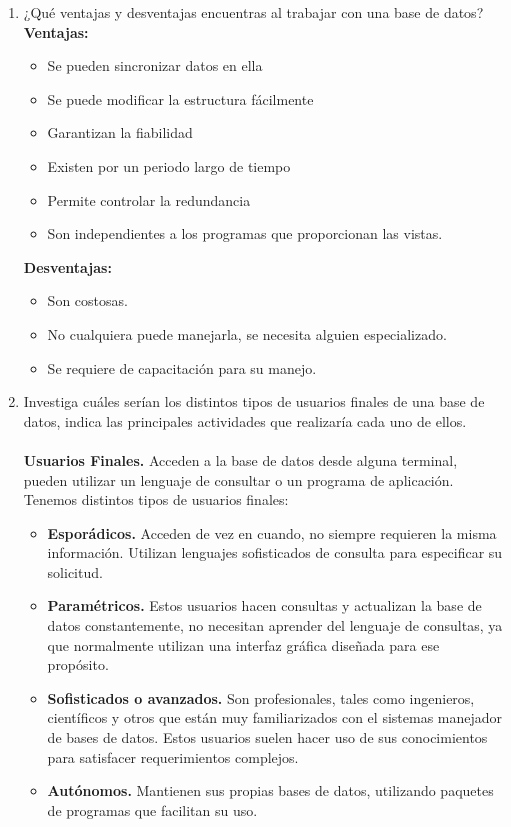\documentclass[12pt]{article}
\begin{document}
\begin{enumerate}
	\item ¿Qué ventajas y desventajas encuentras al trabajar con una
	 base de datos?\\
	 \textbf{Ventajas:}
	 \begin{itemize}
	 	\item Se pueden sincronizar datos en ella
	 	\item Se puede modificar la estructura fácilmente
	 	\item Garantizan la fiabilidad
	 	\item Existen por un periodo largo de tiempo
	 	\item Permite controlar la redundancia 
	 	\item Son independientes a los programas que proporcionan las
	 	vistas.
	 \end{itemize}
 	 \textbf{Desventajas:}
 	 \begin{itemize}
 	 	\item Son costosas.
 	 	\item No cualquiera puede manejarla, se necesita alguien 
 	 	especializado.
 	 	\item Se requiere de capacitación para su manejo.
 	 \end{itemize}
	 \item Investiga  cuáles  serían  los distintos tipos de
	  usuarios finales de una base de datos, indica las principales
	  actividades que realizaría cada uno de ellos. \\\\
	  \textbf{Usuarios Finales.} Acceden a la base de datos desde
	  alguna terminal, pueden utilizar un lenguaje de consultar o un
	  programa de aplicación. Tenemos distintos tipos de usuarios 
	  finales:
	  \begin{itemize}
	  	\item \textbf{Esporádicos.} Acceden de vez en cuando, no 
	  	siempre requieren la misma información. Utilizan lenguajes
	  	sofisticados de consulta para especificar su solicitud.\\
	  	\item \textbf{Paramétricos.} Estos usuarios hacen consultas
	  	y actualizan la base de datos constantemente, no necesitan
	  	aprender del lenguaje de consultas, ya que normalmente 
	  	utilizan una interfaz gráfica diseñada para ese propósito.
	  	\item \textbf{Sofisticados o avanzados.} Son profesionales,
	  	tales como ingenieros, científicos y otros que están muy 
	  	familiarizados con el sistemas manejador de bases de datos.
	  	Estos usuarios suelen hacer uso de sus conocimientos para
	  	satisfacer requerimientos complejos.
	  	\item \textbf{Autónomos.} Mantienen sus propias bases de datos, utilizando paquetes de programas que facilitan su uso.
	  	

\end{itemize}
\end{enumerate}
\end{document}
